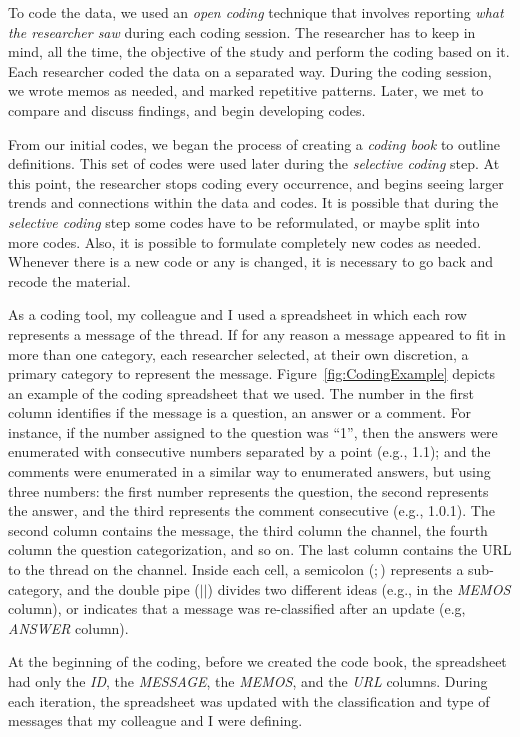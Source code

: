 \documentclass{sig-alternate-05-2015}
\begin{document}
	To code the data, we used an \textit{open coding} technique that involves reporting \textit{what the researcher saw} during each coding session. 
	The researcher has to keep in mind, all the time, the objective of the study and perform the coding based on it.
	Each researcher coded the data on a separated way.
	During the coding session, we wrote memos as needed, and marked repetitive patterns.
	Later, we met to compare and discuss findings, and begin developing codes.

	From our initial codes, we began the process of creating a \textit{coding book} to outline definitions. 
	This set of codes were used later during the \textit{selective coding} step.
	At this point, the researcher stops coding every occurrence, and begins seeing larger trends and connections within the data and codes.
	It is possible that during the \textit{selective coding} step some codes have to be reformulated, or maybe split into more codes. 
	Also, it is possible to formulate completely new codes as needed.
	Whenever there is a new code or any is changed, it is necessary to go back and recode the material.

	As a coding tool, my colleague and I used a spreadsheet in which each row represents a message of the thread.
	If for any reason a message appeared to fit in more than one category, each researcher selected, at their own discretion, a primary category to represent the message.
	Figure~\ref{fig:CodingExample} depicts an example of the coding spreadsheet that we used.
	The number in the first column identifies if the message is a question, an answer or a comment. 
	For instance, if the number assigned to the question was ``1'', then the answers were enumerated with consecutive numbers separated by a point (e.g., 1.1); and the comments were enumerated in a similar way to enumerated answers, but using three numbers: the first number represents the question, the second represents the answer, and the third represents the comment consecutive (e.g., 1.0.1). 
	The second column contains the message, the third column the channel, the fourth column the question categorization, and so on.
	The last column contains the URL to the thread on the channel.
	Inside each cell, a semicolon ($;$) represents a sub-category, and the double pipe ($||$) divides two different ideas (e.g., in the \textit{MEMOS} column), or indicates that a message was re-classified after an update (e.g, \textit{ANSWER} column).

	At the beginning of the coding, before we created the code book, the spreadsheet had only the \textit{ID}, the \textit{MESSAGE}, the \textit{MEMOS}, and the \textit{URL} columns.
	During each iteration, the spreadsheet was updated with the classification and type of messages that my colleague and I were defining.
\end{document}
